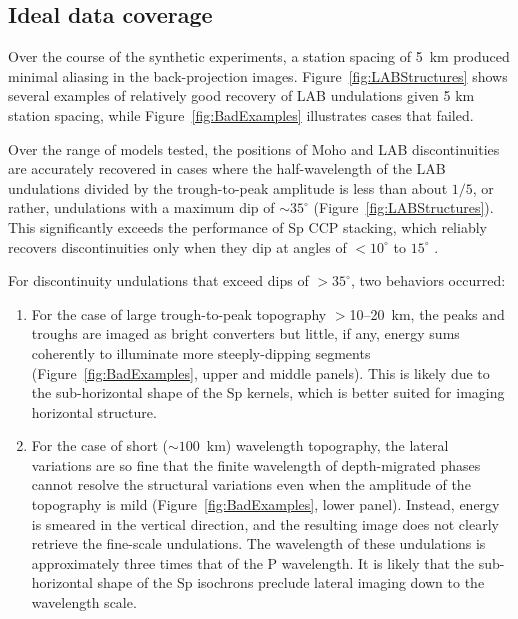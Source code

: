 \documentclass[referee]{gji}
\begin{document}
\subsection{Ideal data coverage}

Over the course of the synthetic experiments, a station spacing of 5~km produced minimal aliasing in the back-projection images. Figure~\ref{fig:LABStructures} shows several examples of relatively good recovery of LAB undulations given 5 km station spacing, while Figure~\ref{fig:BadExamples} illustrates cases that failed.

Over the range of models tested, the positions of Moho and LAB discontinuities are accurately recovered in cases where the half-wavelength of the LAB undulations divided by the trough-to-peak amplitude is less than about $1/5$, or rather, undulations with a maximum dip of $\sim35^\circ$ (Figure~\ref{fig:LABStructures}).  This significantly exceeds the performance of Sp CCP stacking, which reliably recovers discontinuities only when they dip at angles of  $<10^\circ$ to $15^\circ$ \citep{Lekic2017}.

For discontinuity undulations that exceed dips of $>35^\circ$, two behaviors occurred:
\begin{enumerate}
\item For the case of large trough-to-peak topography $>$10--20~km, the peaks and troughs are imaged as bright converters but little, if any, energy sums coherently to illuminate more steeply-dipping segments (Figure~\ref{fig:BadExamples}, upper and middle panels).  This is likely due to the sub-horizontal shape of the Sp kernels, which is better suited for imaging horizontal structure.
\item For the case of short ($\sim 100$~km) wavelength topography, the lateral variations are so fine that the finite wavelength of depth-migrated phases cannot resolve the structural variations even when the amplitude of the topography is mild (Figure~\ref{fig:BadExamples}, lower panel).  Instead, energy is smeared in the vertical direction, and the resulting image does not clearly retrieve the fine-scale undulations.  The wavelength of these undulations is approximately three times that of the P wavelength.  It is likely that the sub-horizontal shape of the Sp isochrons preclude lateral imaging down to the wavelength scale.
\end{enumerate}
\end{document}
